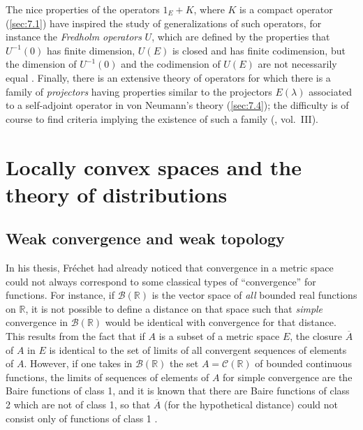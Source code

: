 \documentclass[12pt,a4paper,leqno,twoside]{extbook}
\newcommand{\B}{\mathcal{B}}
\newcommand{\Cont}{\mathcal{C}}
\newcommand{\R}{\mathbb{R}}
\begin{document}
The nice properties of the operators \(1_E + K\), where \(K\) is a compact operator (\ref{sec:7.1}) have inspired the study of generalizations of such operators, for instance the \emph{Fredholm operators} \(U\), which are defined by the properties that \(U^{-1}(0)\) has finite dimension, \(U(E)\) is closed and has finite codimension, but the dimension of \(U^{-1}(0)\) and the codimension of \(U(E)\) are not necessarily equal \cite{133}. Finally, there is an extensive theory of operators for which there is a family of \emph{projectors} having properties similar to the projectors \(E(\lambda)\) associated to a self-adjoint operator in von Neumann's theory (\ref{sec:7.4}); the difficulty is of course to find criteria implying the existence of such a family (\cite{062}, vol.~III).

\chapter{Locally convex spaces and the theory of distributions}
\label{ch:8}
\setcounter{equation}{0}

\section{Weak convergence and weak topology}
\label{sec:8.1}

In his thesis, Fréchet had already noticed that convergence in a metric space could not always correspond to some classical types of ``convergence'' for functions. For instance, if \(\B(\R)\) is the vector space of \emph{all} bounded real functions on \(\R\), it is not possible to define a distance on that space such that \emph{simple} convergence in \(\B(\R)\) would be identical with convergence for that distance. This results from the fact that if \(A\) is a subset of a metric space \(E\), the closure \(\overline{A}\) of \(A\) in \(E\) is identical to the set of limits of all convergent sequences of elements of \(A\). However, if one takes in \(\B(\R)\) the set \(A = \Cont(\R)\) of bounded continuous functions, the limits of sequences of elements of \(A\) for simple convergence are the Baire functions of class 1, and it is known that there are Baire functions of class 2 which are not of class 1, so that \(\overline{A}\) (for the hypothetical distance) could not consist only of functions of class 1 \cite[p.~115]{071}.
\end{document}
